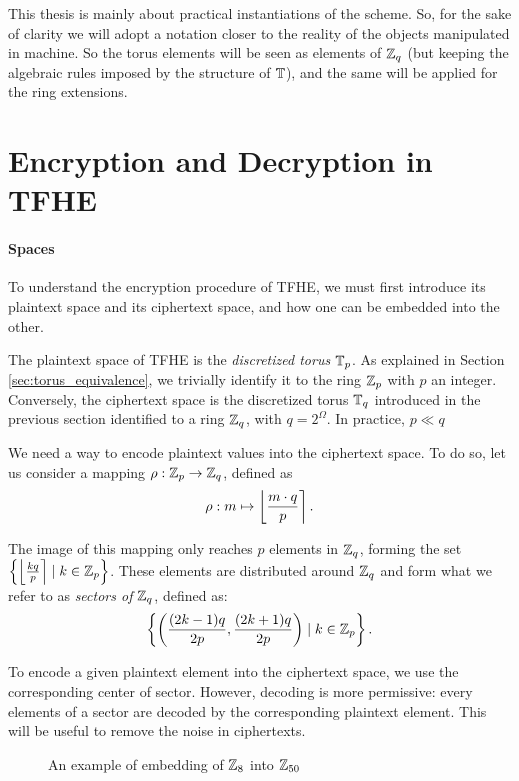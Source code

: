This thesis is mainly about practical instantiations of the scheme. So, for the sake of clarity we will adopt a notation closer to the reality of the objects manipulated in machine. So the torus elements will be seen as elements of $\mathbb{Z}_q$ (but keeping the algebraic rules imposed by the structure of $\mathbb{T}$), and the same will be applied for the ring extensions. 



\section{Encryption and Decryption in TFHE}

\paragraph{Spaces}

To understand the encryption procedure of TFHE, we must first introduce its plaintext space and its ciphertext space, and how one can be embedded into the other.

The plaintext space of TFHE is the \textit{discretized torus} $\mathbb{T}_p$. As explained in Section \ref{sec:torus_equivalence}, we trivially identify it to the ring $\mathbb{Z}_p$ with $p$ an integer. Conversely, the ciphertext space is the discretized torus $\mathbb{T}_q$ introduced in the previous section identified to a ring $\mathbb{Z}_q$, with $q = 2^\Omega$. In practice, $p \ll q$


We need a way to encode plaintext values into the ciphertext space. To do so, let us consider a mapping $\rho: \mathbb{Z}_p \rightarrow \mathbb{Z}_q$, defined as \[
\rho: m  \mapsto \left \lfloor \frac{m \cdot q} {p} \right \rceil.
\]


The image of this mapping only reaches $p$ elements in $\mathbb{Z}_q$, forming the set $\left \{ \left \lfloor \frac {k q}{p} \right \rceil \mid k \in \mathbb{Z}_p \right \}$. These elements are distributed around $\mathbb{Z}_q$ and form what we refer to as \emph{sectors of $\mathbb{Z}_q$}, defined as: \[
\left \{ \left ( \frac{(2 k - 1)q}{2p}, \frac{(2k + 1)q}{2p} \right ) \mid k \in \mathbb{Z}_p \right \}.
\]

To encode a given plaintext element into the ciphertext space, we use the corresponding center of sector. However, decoding is more permissive: every elements of a sector are decoded by the corresponding plaintext element. This will be useful to remove the noise in ciphertexts.

\begin{figure}[htbp]
	\centering
	\caption{An example of embedding of $\mathbb{Z}_8$ into $\mathbb{Z}_{50}$}
\end{figure}

